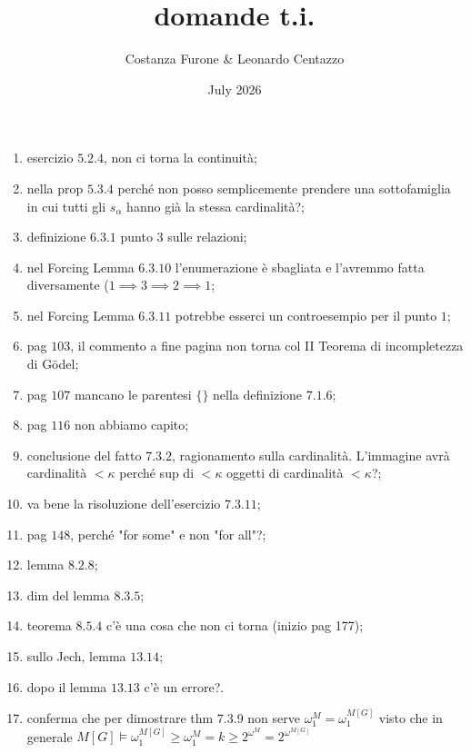 \documentclass{book}
\title{domande t.i.}
\author{Costanza Furone & Leonardo Centazzo}
\date{July 2026}
\begin{document}
\begin{enumerate}
  \item esercizio $5.2.4$, non ci torna la continuità;
  \item nella prop $5.3.4$ perché non posso semplicemente prendere una sottofamiglia in cui tutti gli $s_\alpha$ hanno già la stessa cardinalità?;
  \item definizione $6.3.1$ punto $3$ sulle relazioni;
  \item nel Forcing Lemma $6.3.10$ l'enumerazione è sbagliata e l'avremmo fatta diversamente ($1 \implies 3 \implies 2 \implies 1$;
  \item nel Forcing Lemma $6.3.11$ potrebbe esserci un controesempio per il punto $1$;
  \item pag $103$, il commento a fine pagina non torna col II Teorema di incompletezza di Gödel;
  \item pag $107$ mancano le parentesi $\{ \}$ nella definizione $7.1.6$;
  \item pag $116$ non abbiamo capito;
  \item conclusione del fatto $7.3.2$, ragionamento sulla cardinalità. L'immagine avrà cardinalità $< \kappa$ perché sup di $< \kappa$ oggetti di cardinalità $< \kappa$?;
  \item va bene la risoluzione dell'esercizio $7.3.11$;
  \item pag $148$, perché "for some" e non "for all"?;
  \item lemma $8.2.8$;
  \item dim del lemma $8.3.5$;
  \item teorema $8.5.4$ c'è una cosa che non ci torna (inizio pag 177);
  \item sullo Jech, lemma $13.14$;
  \item dopo il lemma $13.13$ c'è un errore?.
  \item conferma che per dimostrare thm 7.3.9 non serve $\omega_1 ^M = \omega_1 ^{M[G]}$ visto che in generale $M[G] \models \omega_1^{M[G]} \geq \omega_1^M = k \geq 2^{\omega}^M = 2^{\omega}^{M[G]}$
\end{enumerate}
\end{document}
